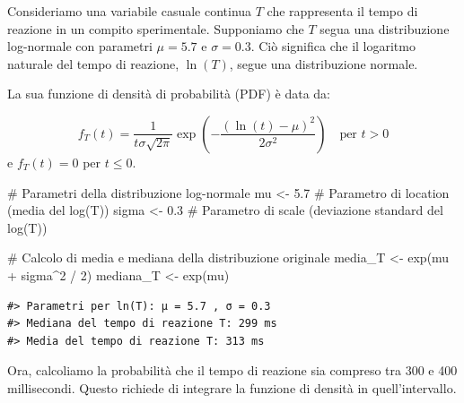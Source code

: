 \documentclass[
  letterpaper,
  DIV=11,
  numbers=noendperiod,
  oneside]{scrreprt}
\newenvironment{Shaded}{\begin{snugshade}}{\end{snugshade}}
\newcommand{\CommentTok}[1]{\textcolor[rgb]{0.37,0.37,0.37}{#1}}
\newcommand{\DecValTok}[1]{\textcolor[rgb]{0.68,0.00,0.00}{#1}}
\newcommand{\FloatTok}[1]{\textcolor[rgb]{0.68,0.00,0.00}{#1}}
\newcommand{\FunctionTok}[1]{\textcolor[rgb]{0.28,0.35,0.67}{#1}}
\newcommand{\NormalTok}[1]{\textcolor[rgb]{0.00,0.23,0.31}{#1}}
\newcommand{\OtherTok}[1]{\textcolor[rgb]{0.00,0.23,0.31}{#1}}
\newcommand{\SpecialCharTok}[1]{\textcolor[rgb]{0.37,0.37,0.37}{#1}}
\theoremstyle{definition}
\theoremstyle{plain}
\theoremstyle{definition}
\theoremstyle{remark}
\begin{document}
\begin{tcolorbox}[enhanced jigsaw, arc=.35mm, breakable, colbacktitle=quarto-callout-note-color!10!white, opacityback=0, toprule=.15mm, rightrule=.15mm, colback=white, opacitybacktitle=0.6, leftrule=.75mm, coltitle=black, bottomtitle=1mm, left=2mm, toptitle=1mm, title=\textcolor{quarto-callout-note-color}{\faInfo}\hspace{0.5em}{Esempio: tempo di reazione in un intervallo}, titlerule=0mm, bottomrule=.15mm, colframe=quarto-callout-note-color-frame]

Consideriamo una variabile casuale continua \(T\) che rappresenta il
tempo di reazione in un compito sperimentale. Supponiamo che \(T\) segua
una distribuzione log-normale con parametri \(\mu = 5.7\) e
\(\sigma = 0.3\). Ciò significa che il logaritmo naturale del tempo di
reazione, \(\ln(T)\), segue una distribuzione normale.

La sua funzione di densità di probabilità (PDF) è data da:

\[
f_T(t) = \frac{1}{t \sigma \sqrt{2\pi}} \exp\left(-\frac{(\ln(t) - \mu)^2}{2\sigma^2}\right) \quad \text{per } t > 0
\] e \(f_T(t) = 0\) per \(t \leq 0\).

\begin{Shaded}
\begin{Highlighting}[]
\CommentTok{\# Parametri della distribuzione log{-}normale}
\NormalTok{mu }\OtherTok{\textless{}{-}} \FloatTok{5.7}   \CommentTok{\# Parametro di location (media del log(T))}
\NormalTok{sigma }\OtherTok{\textless{}{-}} \FloatTok{0.3} \CommentTok{\# Parametro di scale (deviazione standard del log(T))}

\CommentTok{\# Calcolo di media e mediana della distribuzione originale}
\NormalTok{media\_T }\OtherTok{\textless{}{-}} \FunctionTok{exp}\NormalTok{(mu }\SpecialCharTok{+}\NormalTok{ sigma}\SpecialCharTok{\^{}}\DecValTok{2} \SpecialCharTok{/} \DecValTok{2}\NormalTok{)}
\NormalTok{mediana\_T }\OtherTok{\textless{}{-}} \FunctionTok{exp}\NormalTok{(mu)}
\end{Highlighting}
\end{Shaded}

\begin{verbatim}
#> Parametri per ln(T): µ = 5.7 , σ = 0.3
#> Mediana del tempo di reazione T: 299 ms
#> Media del tempo di reazione T: 313 ms
\end{verbatim}

Ora, calcoliamo la probabilità che il tempo di reazione sia compreso tra
300 e 400 millisecondi. Questo richiede di integrare la funzione di
densità in quell'intervallo.


\end{tcolorbox}
\end{document}

